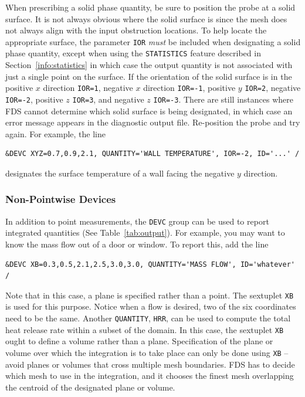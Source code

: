 \documentclass[11pt]{book}
\newcommand{\ct}{\tt\small}
\begin{document}
When prescribing a solid phase quantity, be sure to position the
probe at a solid surface. It is not always obvious where the
solid surface is since the mesh does not always align with the input obstruction
locations. To help locate the appropriate surface, the parameter {\ct IOR} {\em must} be included
when designating a solid phase quantity, except when using the {\ct STATISTICS} feature described in
Section~\ref{info:statistics} in which case the output quantity is not associated with just a single point
on the surface.
If the orientation of the solid surface is in the
positive $x$ direction {\ct IOR=1}, negative $x$ direction {\ct IOR=-1},
positive $y$ {\ct IOR=2}, negative {\ct IOR=-2}, positive $z$ {\ct IOR=3},
and negative $z$ {\ct IOR=-3}. There are still instances where FDS cannot
determine which solid surface is being designated, in which case an
error message appears in the diagnostic output file.
Re-position the probe and try again. For example, the line

\footnotesize
\begin{verbatim}
&DEVC XYZ=0.7,0.9,2.1, QUANTITY='WALL TEMPERATURE', IOR=-2, ID='...' /
\end{verbatim}
\normalsize

\noindent
designates the surface temperature of a wall facing the negative $y$
direction.

\subsubsection{Non-Pointwise Devices}

In addition to point measurements, the {\ct DEVC} group can be used
to report integrated quantities (See Table~\ref{tab:output}).
For example, you may want to know the mass flow out of a door or window.
To report this, add the line

\footnotesize
\begin{verbatim}
&DEVC XB=0.3,0.5,2.1,2.5,3.0,3.0, QUANTITY='MASS FLOW', ID='whatever' /
\end{verbatim}
\normalsize

\noindent
Note that in this case, a plane is specified rather than
a point. The sextuplet {\ct XB} is used for this purpose. Notice when a
flow is desired, two of the six coordinates need to be the same. Another
{\ct QUANTITY}, {\ct HRR}, can be used to compute the total heat release
rate within a subset of the domain. In this case, the sextuplet
{\ct XB} ought to define a volume rather than a plane. Specification of
the plane or volume over which the integration is to take place can only
be done using {\ct XB} -- avoid planes or volumes
that cross multiple mesh boundaries. FDS has to decide which mesh to
use in the integration, and it chooses the finest mesh overlapping
the centroid of the designated plane or volume.
\end{document}
